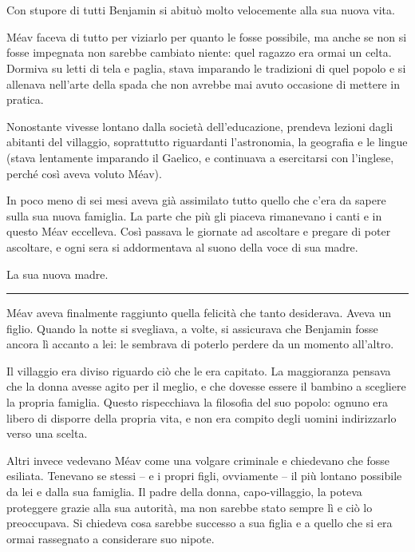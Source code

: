 \chapter{}
\label{ch:5}

Con stupore di tutti Benjamin si abituò molto velocemente alla sua nuova vita.

Méav faceva di tutto per viziarlo per quanto le fosse possibile, ma anche se non si fosse impegnata
non sarebbe cambiato niente: quel ragazzo era ormai un celta. Dormiva su letti di tela e paglia,
stava imparando le tradizioni di quel popolo e si allenava nell'arte della spada che non avrebbe mai
avuto occasione di mettere in pratica.

Nonostante vivesse lontano dalla società dell'educazione, prendeva lezioni dagli abitanti del
villaggio, soprattutto riguardanti l'astronomia, la geografia e le lingue (stava lentamente
imparando il Gaelico, e continuava a esercitarsi con l'inglese, perché così aveva voluto Méav).

In poco meno di sei mesi aveva già assimilato tutto quello che c'era da sapere sulla sua nuova
famiglia. La parte che più gli piaceva rimanevano i canti e in questo Méav eccelleva. Così passava
le giornate ad ascoltare e pregare di poter ascoltare, e ogni sera si addormentava al suono della
voce di sua madre.

La sua nuova madre.

\plainbreak{1}

Méav aveva finalmente raggiunto quella felicità che tanto desiderava. Aveva un figlio. Quando la
notte si svegliava, a volte, si assicurava che Benjamin fosse ancora lì accanto a lei: le sembrava
di poterlo perdere da un momento all'altro.

Il villaggio era diviso riguardo ciò che le era capitato. La maggioranza pensava che la donna avesse
agito per il meglio, e che dovesse essere il bambino a scegliere la propria famiglia. Questo
rispecchiava la filosofia del suo popolo: ognuno era libero di disporre della propria vita, e non
era compito degli uomini indirizzarlo verso una scelta.

Altri invece vedevano Méav come una volgare criminale e chiedevano che fosse esiliata. Tenevano se
stessi -- e i propri figli, ovviamente -- il più lontano possibile da lei e dalla sua famiglia. Il
padre della donna, capo-villaggio, la poteva proteggere grazie alla sua autorità, ma non sarebbe
stato sempre lì e ciò lo preoccupava. Si chiedeva cosa sarebbe successo a sua figlia e a quello che
si era ormai rassegnato a considerare suo nipote.

